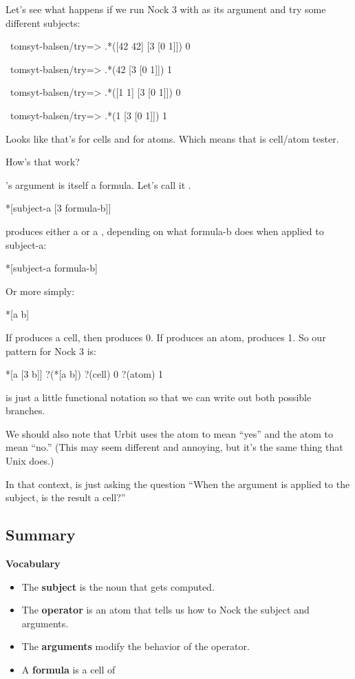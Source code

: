 Let's see what happens if we run Nock 3 with \kode{[0 1]} as its argument and try
some different subjects:
\begin{code}
~tomsyt-balsen/try=> .*([42 42] [3 [0 1]])
0

~tomsyt-balsen/try=> .*(42 [3 [0 1]])
1

~tomsyt-balsen/try=> .*([1 1] [3 [0 1]])
0

~tomsyt-balsen/try=> .*(1 [3 [0 1]])
1
\end{code}
Looks like that's  for cells and  for atoms. Which means that  is
cell/atom tester.

How's that work?

's argument is itself a formula. Let's call it .
\begin{code}
*[subject-a [3 formula-b]]
\end{code}
 produces either a  or a , depending on what formula-b does when
applied to subject-a:
\begin{code}
*[subject-a formula-b]
\end{code}
Or more simply:
\begin{code}
*[a b]
\end{code}
If \kode{*[a b]} produces a cell, then \kode{*[a [3 b]]} produces 0. If \kode{*[a b]} produces
an atom, \kode{*[a [3 b]]} produces 1. So our pattern for Nock 3 is:
\begin{code}
*[a [3 b]]         ?(*[a b])
?(cell)            0
?(atom)            1
\end{code}
 is just a little functional notation so that we can write out both possible branches.

We should also note that Urbit uses the atom  to mean ``yes'' and the atom 
to mean ``no.'' (This may seem different and annoying, but it's
the same thing that Unix does.)

In that context,  is just asking the question ``When the argument is applied to the subject, is the result a cell?''

\subsection{Summary}

\textbf{Vocabulary}

\begin{itemize}
\item The \textbf{subject} is the noun that gets computed.
\item The \textbf{operator} is an atom that tells us how to Nock the subject and arguments.
\item The \textbf{arguments} modify the behavior of the operator.
\item A \textbf{formula} is a cell of 
\end{itemize}

